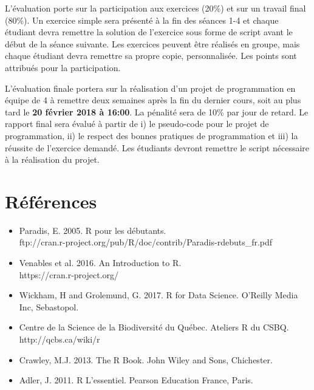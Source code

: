 \documentclass[12]{article}
\begin{document}
	L'évaluation porte sur la participation aux exercices (20\%) et sur un
	travail final (80\%). Un exercice simple sera présenté à la fin des
	séances 1-4 et chaque étudiant devra remettre la solution de l'exercice sous
	forme de script avant le début de la séance suivante. Les exercices
	peuvent être réalisés en groupe, mais chaque étudiant devra remettre sa
	propre copie, personnalisée. Les points sont attribués pour la
	participation.

	L'évaluation finale portera sur la réalisation d'un projet de
	programmation en équipe de 4 à remettre deux semaines après la fin du
	dernier cours, soit au plus tard le \textbf{20 février 2018 à 16:00}. La
	pénalité sera de 10\% par jour de retard. Le rapport final sera évalué à
	partir de i) le pseudo-code pour le projet de programmation, ii) le respect
	des bonnes pratiques de programmation et iii) la réussite de l'exercice
	demandé. Les étudiants devront remettre le script nécessaire à la
	réalisation du projet.

	\section*{Références}

	\begin{itemize}
	\renewcommand{\labelitemi}{$\bullet$}	

		\item Paradis, E. 2005. R pour les débutants. 
		\\ ftp://cran.r-project.org/pub/R/doc/contrib/Paradis-rdebuts\_fr.pdf

		\item Venables et al. 2016. An Introduction to R. 
		\\ https://cran.r-project.org/

		\item Wickham, H and Grolemund, G. 2017. R for Data Science. O'Reilly Media Inc, Sebastopol.  

		\item Centre de la Science de la Biodiversité du Québec. Ateliers R du CSBQ. \\ http://qcbs.ca/wiki/r

		\item Crawley, M.J. 2013. The R Book. John Wiley and Sons, Chichester.

		\item Adler, J. 2011. R L'essentiel. Pearson Education France, Paris.

	\end{itemize}
\end{document}
